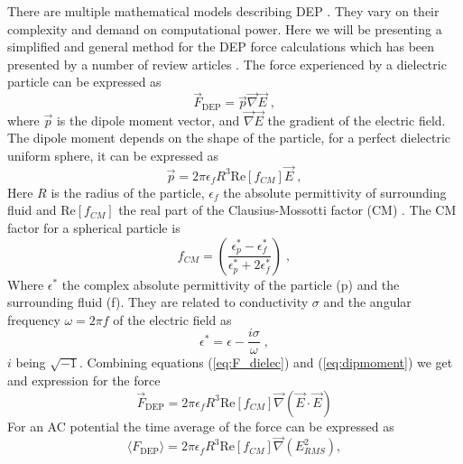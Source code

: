 \documentclass[final]{jyflluk}
\begin{document}
There are multiple mathematical models describing DEP \cite{jubery_dielectrophoretic_2014}. They vary on their complexity and demand on computational power. Here we will be presenting a simplified and general method for the DEP force calculations which has been presented by a number of review articles \cite{voldman_electrical_2006, li_review_2014, cottet_mydep_2019, morgan_single_2007}. The force experienced by a dielectric particle can be expressed as
%
\begin{equation}
   \label{eq:F_dielec}
   \vec{F}_{\mathrm{DEP}} = \vec{p} \vec{\nabla} \vec{E}\;,
\end{equation}
%
where $\vec{p}$  is the dipole moment vector, and $\vec{\nabla} \vec{E}$ the gradient of the electric field. The dipole moment depends on the shape of the particle, for a perfect dielectric uniform sphere, it can be expressed as
%
\begin{equation}
   \label{eq:dipmoment}
   \vec{p} = 2 \pi \epsilon_f R^3 \mathrm{Re}[f_{CM}] \vec{E}\;,
\end{equation}
%
Here $R$ is the radius of the particle, $\epsilon_{f}$ the absolute permittivity of surrounding fluid and $\mathrm{Re}[f_{CM}]$ the real part of the Clausius-Mossotti factor (CM) \cite{li_review_2014}. The CM factor for a spherical particle is
%
\begin{equation}
   \label{eq:CM}
   f_{CM} = \left(\frac{\epsilon_{p}^* - \epsilon_{f}^*}{\epsilon_{p}^* + 2\epsilon_{f}^*} \right)\;,
\end{equation}
%
Where $\epsilon^*$ the complex absolute permittivity of the particle (p) and the surrounding fluid (f). They are related to conductivity $\sigma$ and the angular frequency $\omega=2\pi f$ of the electric field as 
%
\begin{equation}
   \label{eq:complex}
   \epsilon^* = \epsilon - \frac{i \sigma}{\omega}\;,
\end{equation}
%
$i$ being $\sqrt{-1}$. Combining equations (\ref{eq:F_dielec}) and (\ref{eq:dipmoment}) we get and expression for the force
%
\begin{equation}
   \label{eq:F_DEP_norm}
   \vec{F}_{\mathrm{DEP}} = 2 \pi \epsilon_f R^3 \mathrm{Re}[f_{CM}] \vec{\nabla} (\vec{E} \cdot \vec{E}) 
\end{equation}
%
For an AC potential the time average of the force can be expressed as
%
\begin{equation}
   \label{eq:F_DEP}
   \langle F_{\mathrm{DEP}}\rangle = 2 \pi \epsilon_f R^3 \mathrm{Re}[f_{CM}] \vec{\nabla} (E^2_{RMS}) ,
\end{equation}
\end{document}

